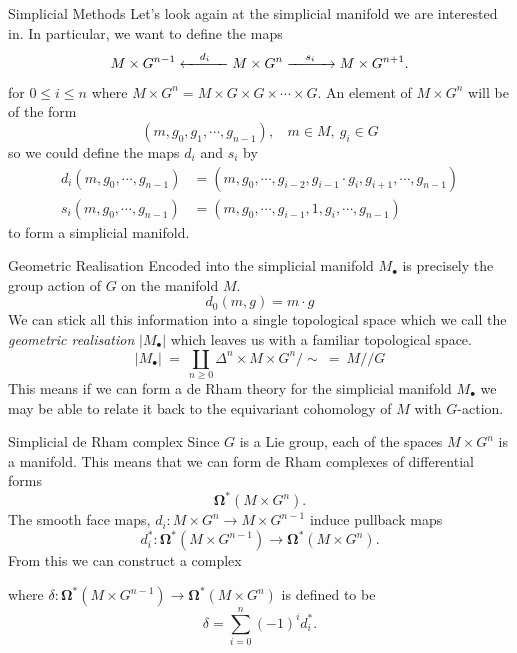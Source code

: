 \documentclass{beamer}
\newcommand{\omg}[1]{\boldsymbol{\Omega}^{#1}}
\begin{document}
\begin{frame}{Simplicial Methods}
Let's look again at the simplicial manifold we are interested in. In particular, we want to define the maps
\[
M \times G^{n-1} \xleftarrow{\mathmakebox[1cm]{d_i}} M \times G^{n} \xrightarrow{\mathmakebox[1cm]{s_i}} M \times G^{n+1}.
\]
for $0 \leq i \leq n$ where $M \times G^n = M \times G \times G \times \cdots \times G$.
An element of $M \times G^n$ will be of the form
\[
(m, g_0, g_1, \cdots, g_{n-1}), ~~~~ m \in M,\ g_i \in G
\]
so we could define the maps $d_i$ and $s_i$ by
\begin{align*}
d_i(m, g_0, \cdots, g_{n-1}) &= (m, g_0, \cdots, g_{i-2}, g_{i-1} \cdot g_i, g_{i+1}, \cdots, g_{n-1})\\
s_i(m, g_0, \cdots, g_{n-1}) &= (m, g_0, \cdots, g_{i-1}, 1, g_{i}, \cdots, g_{n-1})
\end{align*}
to form a simplicial manifold.
\end{frame}

\begin{frame}{Geometric Realisation}
Encoded into the simplicial manifold $M_{\bullet}$ is precisely the group action of $G$ on the manifold $M$.
\[
d_0(m,g) = m \cdot g
\]
We can stick all this information into a single topological space which we call the \emph{geometric realisation} $|M_{\bullet}|$ which leaves us with a familiar topological space.
\[
|M_{\bullet}| ~ = ~ \coprod\limits_{n\geq0} \Delta^{n} \times M \times G^{n} / \sim ~ = ~ M // G
\]
This means if we can form a de Rham theory for the simplicial manifold $M_{\bullet}$ we may be able to relate it back to the equivariant cohomology of $M$ with $G$-action.
\end{frame}



\begin{frame}{Simplicial de Rham complex}
Since $G$ is a Lie group, each of the spaces $M \times G^{n}$ is a manifold. This means that we can form de Rham complexes of differential forms
\[
\omg{*}(M \times G^{n}).
\]
The smooth face maps, $d_i : M \times G^{n} \to M \times G^{n-1}$ induce pullback maps
\[
d_i^* : \omg{*}(M \times G^{n-1}) \to \omg{*}(M \times G^{n}).
\]
From this we can construct a complex
\begin{center}
\end{center}
where $\delta: \omg{*}(M \times G^{n-1}) \to \omg{*}(M \times G^{n})$ is defined to be
\[
\delta = \sum\limits_{i=0}^{n} (-1)^{i}d_i^*.
\]
\end{frame}
\end{document}
